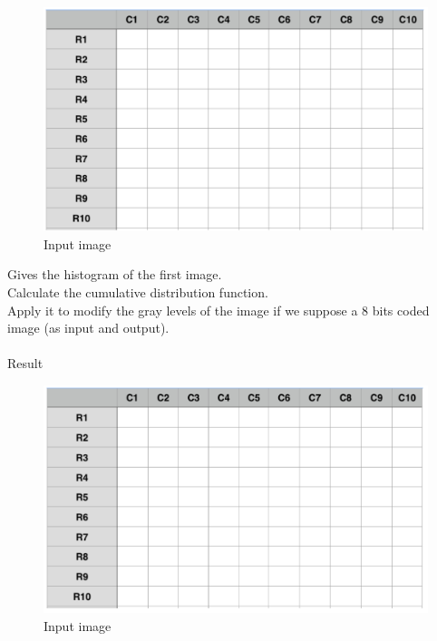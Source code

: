 \documentclass[12pt]{tdtp}
\begin{document}
\begin{figure}[h!]
	\begin{center}
		\includegraphics[scale=0.5]{images/I5.png}
		\caption{Input image}
	\end{center}
\end{figure}

\newpage
\Exo

Gives the histogram of the first image.\\
Calculate the cumulative distribution function.\\
Apply it to modify the gray levels of the image if we suppose a 8 bits coded image (as input and output).\\
\\

Result


\begin{figure}[h!]
	\begin{center}
		\includegraphics[scale=0.5]{images/I6.png}
		\caption{Input image}
	\end{center}
\end{figure}
\end{document}
